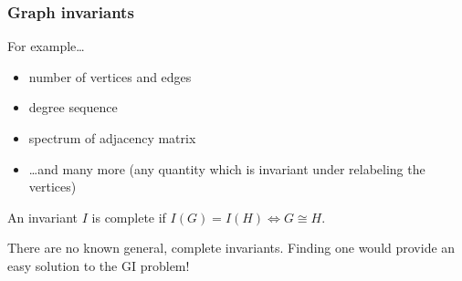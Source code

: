 \documentclass{beamer}
\begin{document}
\begin{frame}
  \frametitle{Graph invariants}
  For example\ldots
  \begin{itemize}
    \item number of vertices and edges
    \item degree sequence
    \item spectrum of adjacency matrix
    \item \ldots and many more (any quantity which is invariant under
      relabeling the vertices)
  \end{itemize}
  \pause
  \begin{definition}
    An invariant $I$ is \alert{complete} if $I(G)=I(H) \iff G \cong H$.
  \end{definition}
  There are no known general, complete invariants. Finding one would provide an
  easy solution to the GI problem!
\end{frame}
\end{document}
